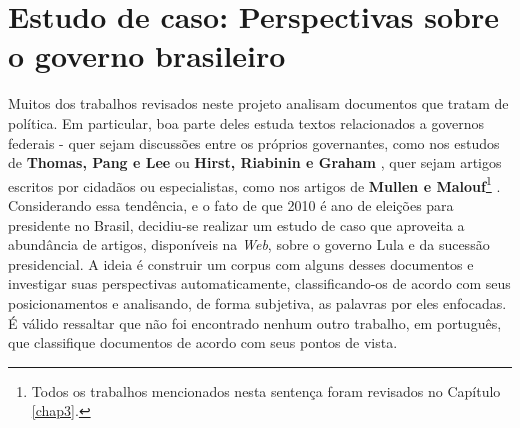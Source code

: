 \chapter{Estudo de caso: Perspectivas sobre o governo brasileiro}
\label{estudo}



Muitos dos trabalhos revisados neste projeto analisam documentos que tratam de política. Em particular, boa parte deles estuda textos relacionados a governos federais - quer sejam discussões entre os próprios governantes, como nos estudos de \textbf{Thomas, Pang e Lee} \cite{get-out-the-vote} ou \textbf{Hirst, Riabinin e Graham} \cite{hirst-et-al}, quer sejam artigos escritos por cidadãos ou especialistas, como nos artigos de \textbf{Mullen e Malouf}\footnote{Todos os trabalhos mencionados nesta sentença foram revisados no Capítulo \ref{chap3}.} \cite{aaai-politics} \cite{malouf-taking_sides}. Considerando essa tendência, e o fato de que 2010 é ano de eleições para presidente no Brasil, decidiu-se realizar um estudo de caso que aproveita a abundância de artigos, disponíveis na \emph{Web}, sobre o governo Lula e da sucessão presidencial. A ideia é construir um corpus com alguns desses documentos e investigar suas perspectivas automaticamente, classificando-os de acordo com seus posicionamentos e analisando, de forma subjetiva, as palavras por eles enfocadas. É válido ressaltar que não foi encontrado nenhum outro trabalho, em português, que classifique documentos de acordo com seus pontos de vista.

